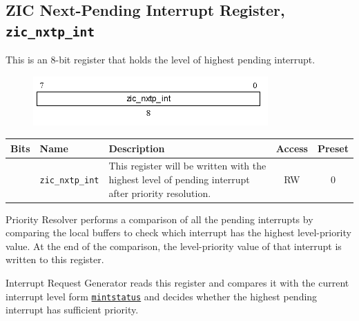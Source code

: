 
\subsection{ZIC Next-Pending Interrupt Register, \texttt{zic\_nxtp\_int}}
\label{subsec:zic-nxtp-int}
This is an 8-bit register that holds the level of highest pending interrupt.

\vspace{0.5cm}
\begin{figure}[H]
    \centering
    \includegraphics[width = 9cm]{images/zic_nxtp_int.png}
    \label{fig:zic_nxtp_int}
\end{figure}
\vspace{0.25cm}

\vspace{0.5cm}
\begin{table}[H]
    \label{tab:zic_nxtp_int}
        \centering
        \begin{tabular}{l l p{7cm} c c}
         \hline 
         \textbf{Bits} & \textbf{Name} & \textbf{Description} & \textbf{Access} & \textbf{Preset}\\ \hline \hline
         [7:0] & \texttt{zic\_nxtp\_int} & This register will be written with the highest level of pending interrupt after priority resolution. & RW & 0\\ \hline
        \end{tabular}
\end{table}
\vspace{0.5cm}

Priority Resolver performs a comparison of all the pending interrupts by comparing the local buffers to check which interrupt has the highest level-priority value. At the end of the comparison, the level-priority value of that interrupt is written to this register.

Interrupt Request Generator reads this register and compares it with the current interrupt level form \texttt{\hyperref[subsec:mintstatus]{mintstatus}} and decides whether the highest pending interrupt has sufficient priority.

